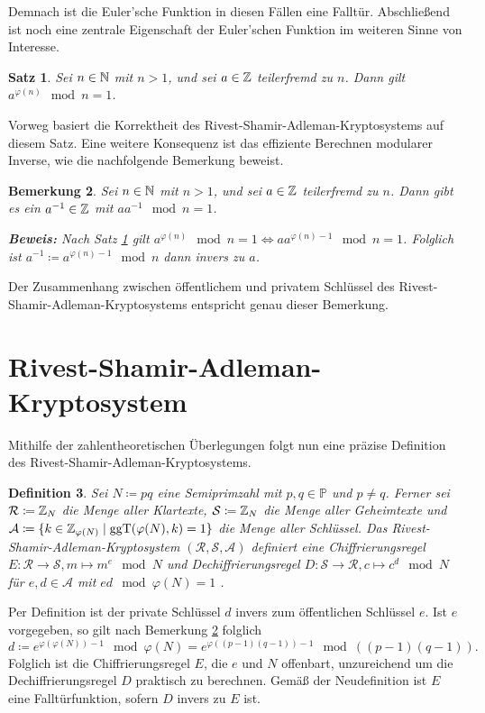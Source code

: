 \documentclass{paper}
\theoremstyle{classic}
\newtheorem{definition}{Definition}[section]
\newtheorem{remark}[definition]{Bemerkung}
\newtheorem{theorem}[definition]{Satz}
\begin{document}
Demnach ist die Euler'sche Funktion in diesen Fällen eine Falltür. Abschließend ist noch eine zentrale Eigenschaft der Euler'schen Funktion im weiteren Sinne von Interesse.
\begin{theorem}
\label{thm:2.4}
Sei \(n \in \mathbb{N}\) mit \(n > 1\), und sei \(a \in \mathbb{Z}\) teilerfremd zu \(n\). Dann gilt \(a^{\varphi(n)} \mod n = 1\).
\end{theorem}
Vorweg basiert die Korrektheit des Rivest-Shamir-Adleman-Kryptosystems auf diesem Satz. Eine weitere Konsequenz ist das effiziente Berechnen modularer Inverse, wie die nachfolgende Bemerkung beweist.
\begin{remark}
\label{rem:2.5}
Sei \(n \in \mathbb{N}\) mit \(n > 1\), und sei \(a \in \mathbb{Z}\) teilerfremd zu \(n\). Dann gibt es ein \(a^{-1} \in \mathbb{Z}\) mit \(a a^{-1} \mod n = 1\).

\textbf{Beweis:} Nach Satz \ref{thm:2.4} gilt \(a^{\varphi(n)} \mod n = 1 \Leftrightarrow a a^{\varphi(n) - 1} \mod n = 1\). Folglich ist \(a^{-1} \coloneqq a^{\varphi(n) - 1} \mod n\) dann invers zu \(a\).
\end{remark}
Der Zusammenhang zwischen öffentlichem und privatem Schlüssel des Rivest-Shamir-Adleman-Kryptosystems entspricht genau dieser Bemerkung.

\section{Rivest-Shamir-Adleman-Kryptosystem}

Mithilfe der zahlentheoretischen Überlegungen folgt nun eine präzise Definition des Rivest-Shamir-Adleman-Kryptosystems.
\begin{definition}
\label{def:3.1}
Sei \(N \coloneqq pq\) eine Semiprimzahl mit \(p,q \in \mathbb{P}\) und \(p \neq q\). Ferner sei \(\mathcal{R} \coloneqq \mathbb{Z}_N\) die Menge aller Klartexte, \(\mathcal{S} \coloneqq \mathbb{Z}_N\) die Menge aller Geheimtexte und \(\mathcal{A} \coloneqq \{k \in \mathbb{Z}_{\varphi(N)} \mid \operatorname{ggT}(\varphi(N),k) = 1\}\) die Menge aller Schlüssel. Das Rivest-Shamir-Adleman-Kryptosystem \((\mathcal{R},\mathcal{S},\mathcal{A})\) definiert eine Chiffrierungsregel \(E : \mathcal{R} \rightarrow \mathcal{S}, m \mapsto m^e \mod N\) und Dechiffrierungsregel \(D : \mathcal{S} \rightarrow \mathcal{R}, c \mapsto c^d \mod N\) für \(e,d \in \mathcal{A}\) mit \(ed \mod \varphi(N) = 1\) \cite{rfc:8017}.
\end{definition}
Per Definition ist der private Schlüssel \(d\) invers zum öffentlichen Schlüssel \(e\). Ist \(e\) vorgegeben, so gilt nach Bemerkung \ref{rem:2.5} folglich
\[
d \coloneqq e^{\varphi(\varphi(N)) - 1} \mod \varphi(N) = e^{\varphi\left( (p - 1)(q - 1) \right) - 1} \mod \left( (p - 1)(q - 1) \right).
\]
Folglich ist die Chiffrierungsregel \(E\), die \(e\) und \(N\) offenbart, unzureichend um die Dechiffrierungsregel \(D\) praktisch zu berechnen. Gemäß der Neudefinition ist \(E\) eine Falltürfunktion, sofern \(D\) invers zu \(E\) ist.
\end{document}
